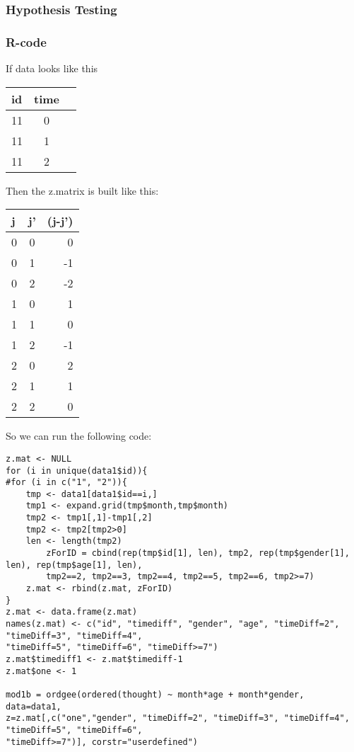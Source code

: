 \documentclass[]{article}
\begin{document}
	\subsubsection{Hypothesis Testing}

	\subsubsection{R-code}
	If data looks like this
	\begin{tabular}{ l c r }
  id & time \\
  \hline
  11 & 0 \\
  11 & 1 \\
  11 & 2 \\
  \end{tabular}

Then the z.matrix is built  like this:
	\begin{tabular}{ l c r }
  j & j' & (j-j') \\
  \hline
  0 & 0 & 0\\
  0 & 1 & -1 \\
  0 & 2 & -2 \\
  1 & 0 & 1 \\
  1 & 1 & 0 \\
  1 & 2 & -1 \\
  2 & 0 & 2 \\
  2 & 1 & 1 \\
  2 & 2 & 0 \\
  \end{tabular}


So we can run the following code:
\begin{verbatim}
z.mat <- NULL
for (i in unique(data1$id)){
#for (i in c("1", "2")){
    tmp <- data1[data1$id==i,]
    tmp1 <- expand.grid(tmp$month,tmp$month)
    tmp2 <- tmp1[,1]-tmp1[,2]
    tmp2 <- tmp2[tmp2>0]
    len <- length(tmp2)
		zForID = cbind(rep(tmp$id[1], len), tmp2, rep(tmp$gender[1], len), rep(tmp$age[1], len),
		tmp2==2, tmp2==3, tmp2==4, tmp2==5, tmp2==6, tmp2>=7)
    z.mat <- rbind(z.mat, zForID)
}
z.mat <- data.frame(z.mat)
names(z.mat) <- c("id", "timediff", "gender", "age", "timeDiff=2", "timeDiff=3", "timeDiff=4",
"timeDiff=5", "timeDiff=6", "timeDiff>=7")
z.mat$timediff1 <- z.mat$timediff-1
z.mat$one <- 1

mod1b = ordgee(ordered(thought) ~ month*age + month*gender, data=data1,
z=z.mat[,c("one","gender", "timeDiff=2", "timeDiff=3", "timeDiff=4", "timeDiff=5", "timeDiff=6",
"timeDiff>=7")], corstr="userdefined")
\end{verbatim}
\end{document}
